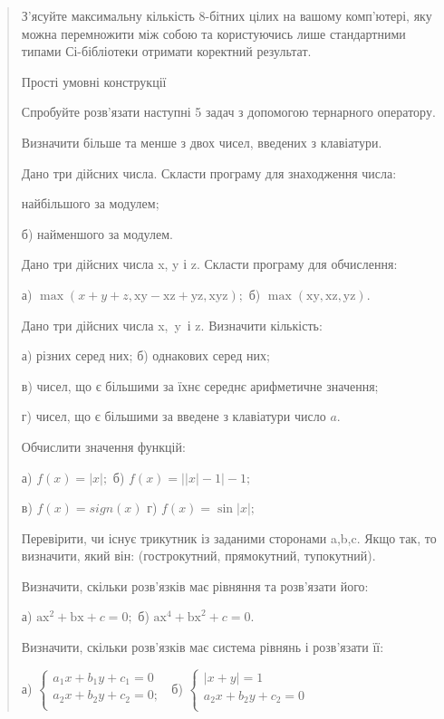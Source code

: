 \documentclass[]{article}
\begin{document}
\begin{quote}
З'ясуйте максимальну кількість 8-бітних цілих на вашому комп'ютері, яку
можна перемножити між собою та користуючись лише стандартними типами
Сі-бібліотеки отримати коректний результат.

Прості умовні конструкції

Спробуйте розв'язати наступні 5 задач з допомогою тернарного оператору.

Визначити більше та менше з двох чисел, введених з клавіатури.

Дано три дійсних числа. Скласти програму для знаходження числа:

найбільшого за модулем;

б) найменшого за модулем.

Дано три дійсних числа x, y і z. Скласти програму для обчислення:

а)
\(\mathrm{\max}\left( x + y + z,\mathrm{\text{xy}} - \mathrm{\text{xz}} + \mathrm{\text{yz}},\mathrm{\text{xyz}} \right);\)
б)
\(\mathrm{\max}\left( \mathrm{\text{xy}},\mathrm{\text{xz}},\mathrm{\text{yz}} \right)\mathrm{.}\)

Дано три дійсних числа x,~y~і z. Визначити кількість:

а) різних серед них; б) однакових серед них;

в) чисел, що є більшими за їхнє середнє арифметичне значення;

г) чисел, що є більшими за введене з клавіатури число \(a\).

Обчислити значення функцій:

а) \(f\left( x \right) = \left| x \right|;\) б)
\(f\left( x \right) = \left| \left| x \right| - 1 \right| - 1;\)

в) \(f\left( x \right) = sign(x)\) г)
\(f\left( x \right) = \mathrm{\sin}\left| x \right|;\)

Перевірити, чи існує трикутник із заданими сторонами a,b,c. Якщо так, то
визначити, який він: (гострокутний, прямокутний, тупокутний).

Визначити, скільки розв'язків має рівняння та розв'язати його:

а) \(\mathrm{\text{ax}}^{2} + \mathrm{\text{bx}} + c = 0;\) б)
\(\mathrm{\text{ax}}^{4} + \mathrm{\text{bx}}^{2} + c = 0\mathrm{.}\)

Визначити, скільки розв'язків має система рівнянь і розв'язати її:

а) \(\left\{ \begin{matrix}
a_{1}x + b_{1}y + c_{1} = 0 \\
a_{2}x + b_{2}y + c_{2} = 0; \\
\end{matrix} \right.\ \) б) \(\left\{ \begin{matrix}
\left| x + y \right| = 1 \\
a_{2}x + b_{2}y + c_{2} = 0 \\
\end{matrix} \right.\ \)


\end{quote}
\end{document}
